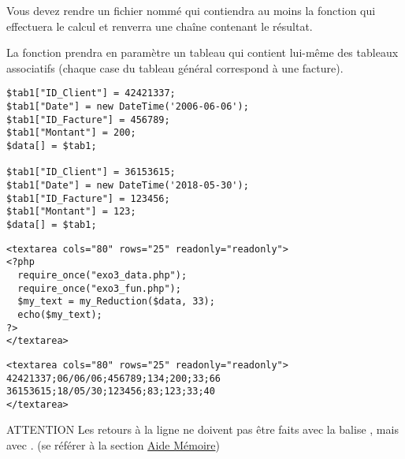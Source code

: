 \bigskip

\noindent Vous devez rendre un fichier nommé  qui contiendra au moins la fonction  qui effectuera le calcul et renverra une chaîne contenant le résultat.

\noindent La fonction prendra en paramètre un tableau qui contient lui-même des tableaux associatifs (chaque case du tableau général correspond à une facture).

\bigskip

\lstset{language=php}
\begin{lstlisting}[frame=single,title={Tableau en entrée (exo3\_data.php)}]
$tab1["ID_Client"] = 42421337;
$tab1["Date"] = new DateTime('2006-06-06');
$tab1["ID_Facture"] = 456789;
$tab1["Montant"] = 200;
$data[] = $tab1;

$tab1["ID_Client"] = 36153615;
$tab1["Date"] = new DateTime('2018-05-30');
$tab1["ID_Facture"] = 123456;
$tab1["Montant"] = 123;
$data[] = $tab1;
\end{lstlisting}

\bigskip

\lstset{language=html}
\begin{lstlisting}[frame=single,title={Appel de la fonction}]
<textarea cols="80" rows="25" readonly="readonly">
<?php
  require_once("exo3_data.php");
  require_once("exo3_fun.php");
  $my_text = my_Reduction($data, 33);
  echo($my_text);
?>
</textarea>
\end{lstlisting}

\lstset{language=html}
\begin{lstlisting}[frame=single,title={Sortie HTML attendue}]
<textarea cols="80" rows="25" readonly="readonly">
42421337;06/06/06;456789;134;200;33;66
36153615;18/05/30;123456;83;123;33;40
</textarea>
\end{lstlisting}

\bigskip

\begin{RedBoxTitle}{ATTENTION}
    Les retours à la ligne ne doivent pas être faits avec la balise , mais avec .
    (se référer à la section \hyperref[sec:AideMemoire]{Aide Mémoire})
\end{RedBoxTitle}